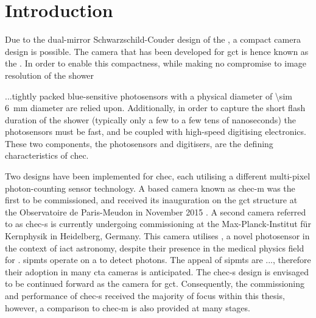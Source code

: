 \section{Introduction}

Due to the dual-mirror Schwarzschild-Couder design of the , a compact camera design is possible. The camera that has been developed for \gls{gct} is hence known as the . In order to enable this compactness, while making no compromise to image resolution of the shower 

...tightly packed blue-sensitive photosensors with a physical diameter of \SI{\sim 6}{mm} diameter are relied upon. Additionally, in order to capture the short flash duration of the shower (typically only a few to a few tens of nanoseconds) the photosensors must be fast, and be coupled with high-speed digitising electronics. These two components, the photosensors and digitisers, are the defining characteristics of \gls{chec}.

Two designs have been implemented for \gls{chec}, each utilising a different multi-pixel photon-counting sensor technology. A  based camera known as \gls{chec-m} was the first to be commissioned, and received its inauguration on the \gls{gct} structure at the Observatoire de Paris-Meudon in November 2015 \cite{Watson2017}. A second camera referred to as \gls{chec-s} is currently undergoing commissioning at the Max-Planck-Institut für Kernphysik in Heidelberg, Germany. This camera utilises , a novel photosensor in the context of \gls{iact} astronomy, despite their presence in the medical physics field for . \glspl{sipmt} operate on a  to detect photons. The appeal of \glspl{sipmt} are ..., therefore their adoption in many \gls{cta} cameras is anticipated. The \gls{chec-s} design is envisaged to be continued forward as the camera for \gls{gct}. Consequently, the commissioning and performance of \gls{chec-s} received the majority of focus within this thesis, however, a comparison to \gls{chec-m} is also provided at many stages.





